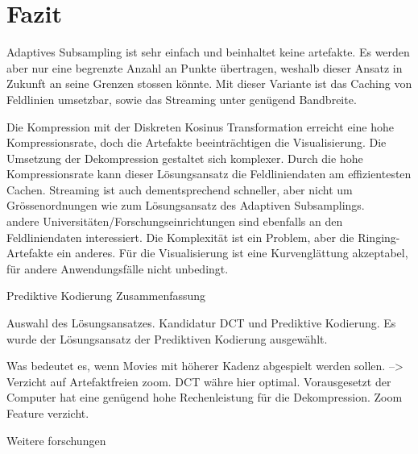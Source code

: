 \section{Fazit}
Adaptives Subsampling ist sehr einfach und beinhaltet keine artefakte. Es werden aber nur eine begrenzte Anzahl an Punkte übertragen, weshalb dieser Ansatz in Zukunft an seine Grenzen stossen könnte. Mit dieser Variante ist das Caching von Feldlinien umsetzbar, sowie das Streaming unter genügend Bandbreite.

Die Kompression mit der Diskreten Kosinus Transformation erreicht eine hohe Kompressionsrate, doch die Artefakte beeinträchtigen die Visualisierung. Die Umsetzung der Dekompression gestaltet sich komplexer. Durch die hohe Kompressionsrate kann dieser Lösungsansatz die Feldliniendaten am effizientesten Cachen. Streaming ist auch dementsprechend schneller, aber nicht um Grössenordnungen wie zum Lösungsansatz des Adaptiven Subsamplings.\\
andere Universitäten/Forschungseinrichtungen sind ebenfalls an den Feldliniendaten interessiert. Die Komplexität ist ein Problem, aber die Ringing-Artefakte ein anderes. Für die Visualisierung ist eine Kurvenglättung akzeptabel, für andere Anwendungsfälle nicht unbedingt.

Prediktive Kodierung 
Zusammenfassung

Auswahl des Lösungsansatzes. Kandidatur DCT und Prediktive Kodierung. 
Es wurde der Lösungsansatz der Prediktiven Kodierung ausgewählt.

Was bedeutet es, wenn Movies mit höherer Kadenz abgespielt werden sollen. --> Verzicht auf Artefaktfreien zoom. DCT währe hier optimal. Vorausgesetzt der Computer hat eine genügend hohe Rechenleistung für die Dekompression.
Zoom Feature verzicht.

Weitere forschungen

